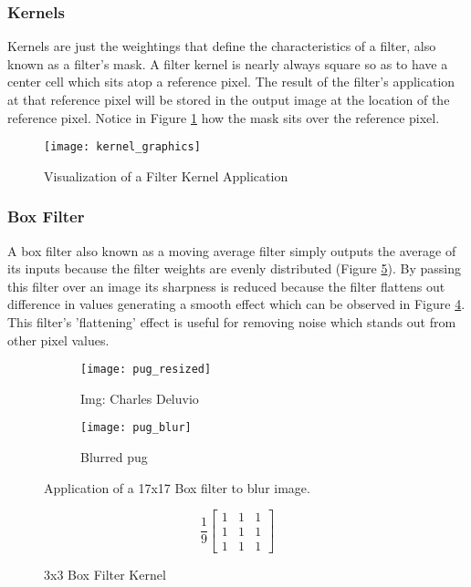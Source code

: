\subsubsection{Kernels}
\label{subsubsection:kernels}
Kernels are just the weightings that define the characteristics of a filter, also known as a filter's mask. A filter kernel is nearly always square so as to have a center cell which sits atop a reference pixel. The result of the filter's application at that reference pixel will be stored in the output image at the location of the reference pixel. Notice in Figure \ref{fig:kernel_graphics} how the mask sits over the reference pixel.

\begin{figure}[H]
 \centering
 \centering\texttt{[image: kernel\_graphics]}
 \caption{Visualization of a Filter Kernel Application}
 \label{fig:kernel_graphics}
\end{figure}

\subsubsection{Box Filter}
\label{subsubsection:boxfilter}
A box filter also known as a moving average filter simply outputs the average of its inputs because the filter weights are evenly distributed (Figure \ref{fig:box_kernel}). By passing this filter over an image its sharpness is reduced because the filter flattens out difference in values generating a smooth effect which can be observed in Figure \ref{fig:pug_blur}. This filter's 'flattening' effect is useful for removing noise which stands out from other pixel values.


\begin{figure}[H]
    \centering
    \begin{subfigure}[b]{0.3\textwidth}
        \texttt{[image: pug\_resized]}
        \caption{Img: Charles Deluvio}
        \label{fig:pug_noise}
    \end{subfigure}
    \begin{subfigure}[b]{0.3\textwidth}
        \texttt{[image: pug\_blur]}
        \caption{Blurred pug}
        \label{fig:pug_denoised}
    \end{subfigure}
    \caption{Application of a 17x17 Box filter to blur image.}
    \label{fig:pug_blur}
\end{figure}

\begin{figure}[H]
   \centering
   \[
     \frac{1}{9}
   \begin{bmatrix}
      1 & 1 & 1 \\
      1 & 1 & 1 \\
      1 & 1 & 1
   \end{bmatrix}
   \]
   \caption{3x3 Box Filter Kernel}
   \label{fig:box_kernel}
\end{figure}

